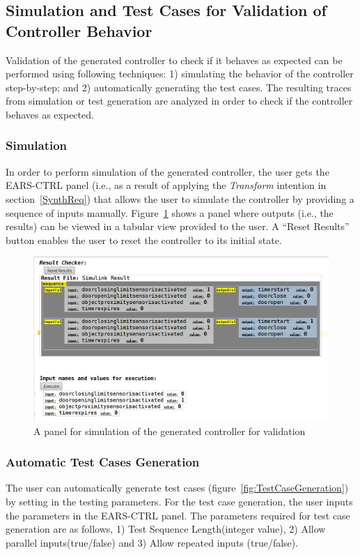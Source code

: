 \subsection{Simulation and Test Cases for Validation of Controller Behavior}
\vspace{-.2cm}
Validation of the generated controller to check if it behaves as expected can be
performed using following techniques: 1) simulating the behavior of the
controller step-by-step; and 2) automatically generating the test cases.
The resulting traces from simulation or test generation are analyzed in order to
check if the controller behaves as expected.
\vspace{-.3cm}
\subsubsection{Simulation}
\vspace{-.2cm}
In order to perform simulation of the generated controller, the user gets the
\textsf{EARS-CTRL} panel (i.e., as a result of applying the \emph{Transform}
intention in section~\ref{SynthReq}) that allows the user to
simulate the controller by providing a sequence of inputs manually.
Figure~\ref{fig:SimulationSteps} shows a panel where outputs (i.e., the results)
can be viewed in a tabular view provided to the user. A \textsf{“Reset Results”}
button enables the user to reset the controller to its initial state. 
\begin{figure}[!h]
\centering
\includegraphics[width=.9\textwidth]{./images/simulation.png}
\caption{A panel for simulation of the generated controller for validation}
\label{fig:SimulationSteps}
\vspace{-.6cm}
\end{figure}
\subsubsection{Automatic Test Cases Generation} 
\vspace{-.5cm}
The user can automatically generate test cases
(figure~\ref{fig:TestCaseGeneration}) by setting in the testing parameters.
For the test case generation, the user inputs the
parameters in the \textsf{EARS-CTRL} panel.
The parameters required for test case generation are as follows, 1) \textsf{Test
Sequence Length(integer value)}, 2) \textsf{Allow parallel inputs(true/false)} and 3) \textsf{Allow repeated inputs (true/false)}.